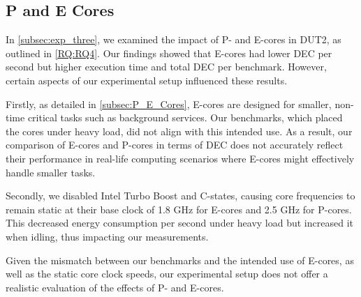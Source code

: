 \subsection{P and E Cores}
In \cref{subsec:exp_three}, we examined the impact of P- and E-cores in DUT2, as outlined in \cref{RQ:RQ4}. Our findings showed that E-cores had lower DEC per second but higher execution time and total DEC per benchmark. However, certain aspects of our experimental setup influenced these results.

Firstly, as detailed in \cref{subsec:P_E_Cores}, E-cores are designed for smaller, non-time critical tasks such as background services. Our benchmarks, which placed the cores under heavy load, did not align with this intended use. As a result, our comparison of E-cores and P-cores in terms of DEC does not accurately reflect their performance in real-life computing scenarios where E-cores might effectively handle smaller tasks.

Secondly, we disabled Intel Turbo Boost and C-states, causing core frequencies to remain static at their base clock of 1.8 GHz for E-cores and 2.5 GHz for P-cores. This decreased energy consumption per second under heavy load but increased it when idling, thus impacting our measurements.

Given the mismatch between our benchmarks and the intended use of E-cores, as well as the static core clock speeds, our experimental setup does not offer a realistic evaluation of the effects of P- and E-cores.

